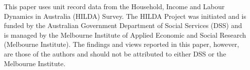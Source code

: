 This paper uses unit record data from the Household, Income and Labour Dynamics in Australia (HILDA) Survey. The HILDA Project was initiated and is funded by the Australian Government Department of Social Services (DSS) and is managed by the Melbourne Institute of Applied Economic and Social Research (Melbourne Institute). The findings and views reported in this paper, however, are those of the authors and should not be attributed to either DSS or the Melbourne Institute.
